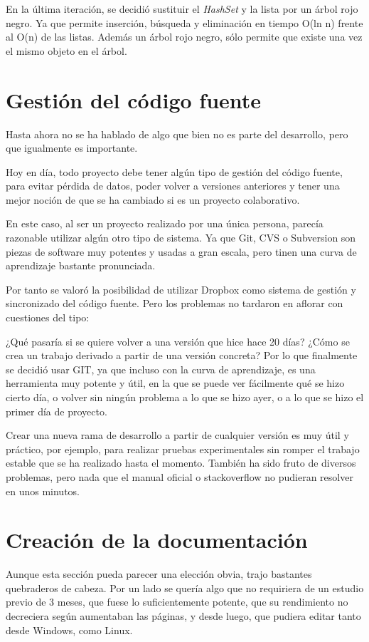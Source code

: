En la \'ultima iteraci\'on, se decidi\'o sustituir el \emph{HashSet} y la lista por un \'arbol rojo negro. Ya que permite
inserci\'on, b\'usqueda y eliminaci\'on en tiempo O(ln n) frente al O(n) de las listas. 
Adem\'as un \'arbol rojo negro, s\'olo permite que existe una vez el mismo objeto en el \'arbol.

\section{Gesti\'{o}n del c\'{o}digo fuente}
Hasta ahora no se ha hablado de algo que bien no es parte del desarrollo, pero que igualmente es importante.

Hoy en d\'ia, todo proyecto debe tener alg\'un tipo de gesti\'on del c\'odigo fuente, para evitar p\'erdida de datos, 
poder volver a versiones anteriores y tener una mejor noci\'on de que se ha cambiado si es un proyecto colaborativo.

En este caso, al ser un proyecto realizado por una \'unica persona, parec\'ia razonable utilizar alg\'un otro tipo
de sistema. Ya que Git, CVS o Subversion son piezas de software muy potentes y usadas a gran escala, pero tinen
una curva de aprendizaje bastante pronunciada.

Por tanto se valor\'o la posibilidad de utilizar Dropbox como sistema de gesti\'on y sincronizado del c\'odigo fuente.
Pero los problemas no tardaron en aflorar con cuestiones del tipo:

¿Qu\'e pasar\'ia si se quiere volver a una versi\'on que hice hace 20 d\'ias? ¿C\'omo se crea un trabajo derivado a partir
de una versi\'on concreta? Por lo que finalmente se decidi\'o usar GIT, ya que incluso con la curva de aprendizaje,
es una herramienta muy potente y \'util, en la que se puede ver f\'acilmente qu\'e se hizo cierto d\'ia, o volver sin 
ning\'un problema a lo que se hizo ayer, o a lo que se hizo el primer d\'ia de proyecto.

Crear una nueva rama de desarrollo a partir de cualquier versi\'on es muy \'util y pr\'actico, por ejemplo, para
realizar pruebas experimentales sin romper el trabajo estable que se ha realizado hasta el momento. Tambi\'en
ha sido fruto de diversos problemas, pero nada que el manual oficial o stackoverflow no pudieran
resolver en unos minutos.

\section{Creaci\'{o}n de la documentaci\'{o}n}
Aunque esta secci\'{o}n pueda parecer una elecci\'{o}n obvia, trajo bastantes quebraderos de cabeza. Por un lado
se quer\'{i}a algo que no requiriera
de un estudio previo de 3 meses, que fuese lo suficientemente potente, que su rendimiento no decreciera seg\'{u}n aumentaban las 
p\'{a}ginas, y desde luego,
que pudiera editar tanto desde Windows, como Linux.

